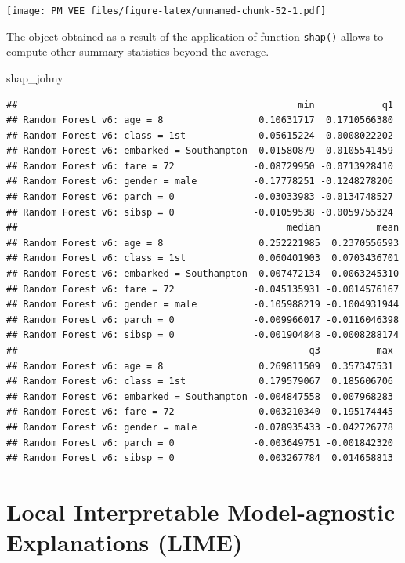 \documentclass[12pt,]{krantz}
\newenvironment{Shaded}{\begin{snugshade}}{\end{snugshade}}
\newcommand{\NormalTok}[1]{#1}
\begin{document}
\texttt{[image: PM\_VEE\_files/figure-latex/unnamed-chunk-52-1.pdf]}

The object obtained as a result of the application of function \texttt{shap()} allows to compute other summary statistics beyond the average.

\begin{Shaded}
\begin{Highlighting}[]
\NormalTok{shap_johny}
\end{Highlighting}
\end{Shaded}

\begin{verbatim}
##                                                  min            q1
## Random Forest v6: age = 8                 0.10631717  0.1710566380
## Random Forest v6: class = 1st            -0.05615224 -0.0008022202
## Random Forest v6: embarked = Southampton -0.01580879 -0.0105541459
## Random Forest v6: fare = 72              -0.08729950 -0.0713928410
## Random Forest v6: gender = male          -0.17778251 -0.1248278206
## Random Forest v6: parch = 0              -0.03033983 -0.0134748527
## Random Forest v6: sibsp = 0              -0.01059538 -0.0059755324
##                                                median          mean
## Random Forest v6: age = 8                 0.252221985  0.2370556593
## Random Forest v6: class = 1st             0.060401903  0.0703436701
## Random Forest v6: embarked = Southampton -0.007472134 -0.0063245310
## Random Forest v6: fare = 72              -0.045135931 -0.0014576167
## Random Forest v6: gender = male          -0.105988219 -0.1004931944
## Random Forest v6: parch = 0              -0.009966017 -0.0116046398
## Random Forest v6: sibsp = 0              -0.001904848 -0.0008288174
##                                                    q3          max
## Random Forest v6: age = 8                 0.269811509  0.357347531
## Random Forest v6: class = 1st             0.179579067  0.185606706
## Random Forest v6: embarked = Southampton -0.004847558  0.007968283
## Random Forest v6: fare = 72              -0.003210340  0.195174445
## Random Forest v6: gender = male          -0.078935433 -0.042726778
## Random Forest v6: parch = 0              -0.003649751 -0.001842320
## Random Forest v6: sibsp = 0               0.003267784  0.014658813
\end{verbatim}

\hypertarget{LIME}{%
\section{Local Interpretable Model-agnostic Explanations (LIME)}\label{LIME}}
\end{document}

